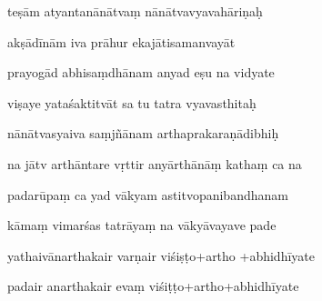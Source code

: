 \documentclass[article,12pt,a4paper]{memoir}%
\newcounter{parCount}
\begin{document}
	  
	  \pstart {} teṣām atyantanānātvaṃ nānātvavyavahāriṇaḥ 
	{}
	\pend%
      

	  
	  \pstart \leavevmode%
	akṣādīnām iva prāhur ekajātisamanvayāt 
	{}
	\pend%
      

	  
	  \pstart {} prayogād abhisaṃdhānam anyad eṣu na vidyate 
	{}
	\pend%
      

	  
	  \pstart \leavevmode%
	viṣaye yataśaktitvāt sa tu tatra vyavasthitaḥ 
	{}
	\pend%
      

	  
	  \pstart {} nānātvasyaiva saṃjñānam arthaprakaraṇādibhiḥ 
	{}
	\pend%
      

	  
	  \pstart \leavevmode%
	na jātv arthāntare vṛttir anyārthānāṃ kathaṃ ca na 
	{}
	\pend%
      

	  
	  \pstart {} padarūpaṃ ca yad vākyam astitvopanibandhanam 
	{}
	\pend%
      

	  
	  \pstart \leavevmode%
	kāmaṃ vimarśas tatrāyaṃ na vākyāvayave pade 
	{}
	\pend%
      

	  
	  \pstart {} yathaivānarthakair varṇair viśiṣṭo+artho +abhidhīyate 
	{}
	\pend%
      

	  
	  \pstart \leavevmode%
	padair anarthakair evaṃ viśiṭṭo+artho+abhidhīyate 
	{}
	\pend%
      
\end{document}
